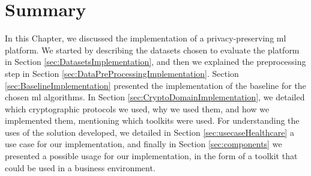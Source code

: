 





  
\section{Summary}
\label{sec:SummaryImplementation}


In this Chapter, we discussed the implementation of a privacy-preserving \ac{ml} platform. We started by describing the datasets chosen to evaluate the platform in Section \ref{sec:DatasetsImplementation}, and then we explained the preprocessing step in Section \ref{sec:DataPreProcessingImplementation}.
Section \ref{sec:BaselineImplementation} presented the implementation of the baseline for the chosen \ac{ml} algorithms.
In Section \ref{sec:CryptoDomainImplementation}, we detailed which cryptographic protocols we used, why we used them, and how we implemented them, mentioning which toolkits were used.
For understanding the uses of the solution developed, we detailed in Section \ref{sec:usecaseHealthcare} a use case for our implementation, and finally in Section \ref{sec:components} we presented a possible usage for our implementation, in the form of a toolkit that could be used in a business environment.


